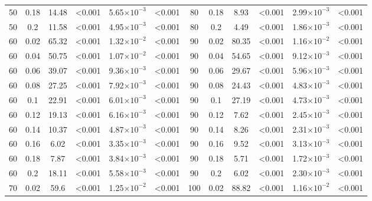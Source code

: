 \documentclass[12pt]{article}
\begin{document}
\begin{spacing}{2.0}
\begin{table}[hb!]
\begin{tabular}{c c | c c| c c ||c c | c c | c c |}
                50  & 0.18  & 14.48 & \textless0.001 & 5.65$\times10^{-3}$ & \textless0.001 & 80  & 0.18  & 8.93  & \textless0.001 & 2.99$\times10^{-3}$ & \textless0.001 \\
                50  & 0.2 & 11.58 & \textless0.001 & 4.95$\times10^{-3}$ & \textless0.001 & 80  & 0.2 & 4.49  & \textless0.001 & 1.86$\times10^{-3}$ & \textless0.001 \\
                60  & 0.02  & 65.32 & \textless0.001 & 1.32$\times10^{-2}$ & \textless0.001 & 90  & 0.02  & 80.35 & \textless0.001 & 1.16$\times10^{-2}$ & \textless0.001 \\
                60  & 0.04  & 50.75 & \textless0.001 & 1.07$\times10^{-2}$ & \textless0.001 & 90  & 0.04  & 54.65 & \textless0.001 & 9.12$\times10^{-3}$ & \textless0.001 \\
                60  & 0.06  & 39.07 & \textless0.001 & 9.36$\times10^{-3}$ & \textless0.001 & 90  & 0.06  & 29.67 & \textless0.001 & 5.96$\times10^{-3}$ & \textless0.001 \\
                60  & 0.08  & 27.25 & \textless0.001 & 7.92$\times10^{-3}$ & \textless0.001 & 90  & 0.08  & 24.43 & \textless0.001 & 4.83$\times10^{-3}$ & \textless0.001 \\
                60  & 0.1 & 22.91 & \textless0.001 & 6.01$\times10^{-3}$ & \textless0.001 & 90  & 0.1 & 27.19 & \textless0.001 & 4.73$\times10^{-3}$ & \textless0.001 \\
                60  & 0.12  & 19.13 & \textless0.001 & 6.16$\times10^{-3}$ & \textless0.001 & 90  & 0.12  & 7.62  & \textless0.001 & 2.45$\times10^{-3}$ & \textless0.001 \\
                60  & 0.14  & 10.37 & \textless0.001 & 4.87$\times10^{-3}$ & \textless0.001 & 90  & 0.14  & 8.26  & \textless0.001 & 2.31$\times10^{-3}$ & \textless0.001 \\
                60  & 0.16  & 6.02  & \textless0.001 & 3.35$\times10^{-3}$ & \textless0.001 & 90  & 0.16  & 9.52  & \textless0.001 & 3.13$\times10^{-3}$ & \textless0.001 \\
                60  & 0.18  & 7.87  & \textless0.001 & 3.84$\times10^{-3}$ & \textless0.001 & 90  & 0.18  & 5.71  & \textless0.001 & 1.72$\times10^{-3}$ & \textless0.001 \\
                60  & 0.2 & 18.11 & \textless0.001 & 5.58$\times10^{-3}$ & \textless0.001 & 90  & 0.2 & 6.02  & \textless0.001 & 2.30$\times10^{-3}$ & \textless0.001 \\
                70  & 0.02  & 59.6  & \textless0.001 & 1.25$\times10^{-2}$ & \textless0.001 & 100 & 0.02  & 88.82 & \textless0.001 & 1.16$\times10^{-2}$ & \textless0.001 \\

\end{tabular}
\end{table}
\end{spacing}
\end{document}
